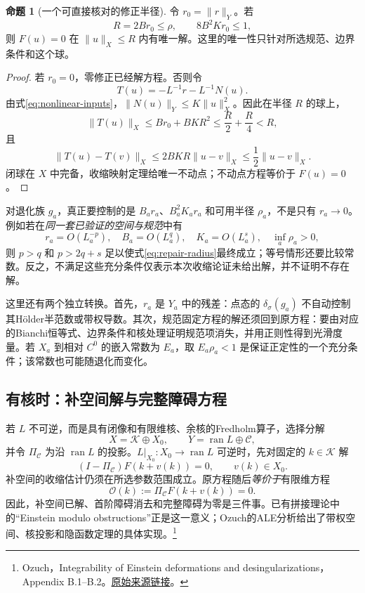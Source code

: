 \documentclass[11pt,a4paper]{article}
\theoremstyle{definition}
\newtheorem{proposition}[definition]{命题}
\newcommand{\src}[3]{\footnote{\raggedright #1，#2。\href{#3}{原始来源链接}。}}
\begin{document}
\begin{proposition}[一个可直接核对的修正半径]\label{prop:repair-radius}
令 $r_0=\|r\|_Y$。若
\begin{equation}\label{eq:repair-radius}
 R=2Br_0\le\rho,\qquad 8B^2Kr_0\le1,
\end{equation}
则 $F(u)=0$ 在 $\|u\|_X\le R$ 内有唯一解。这里的唯一性只针对所选规范、边界条件和这个球。
\end{proposition}
\begin{proof}
若 $r_0=0$，零修正已经解方程。否则令
\[
 T(u)=-L^{-1}r-L^{-1}N(u).
\]
由式\eqref{eq:nonlinear-inputs}，$\|N(u)\|_Y\le K\|u\|_X^2$。因此在半径 $R$ 的球上，
\[
 \|T(u)\|_X\le Br_0+BKR^2\le\frac R2+\frac R4< R,
\]
且
\[
 \|T(u)-T(v)\|_X\le2BKR\|u-v\|_X
 \le\frac12\|u-v\|_X.
\]
闭球在 $X$ 中完备，收缩映射定理给唯一不动点；不动点方程等价于 $F(u)=0$。
\end{proof}

对退化族 $g_a$，真正要控制的是 $B_ar_a$、$B_a^2K_ar_a$ 和可用半径 $\rho_a$，不是只有 $r_a\to0$。例如若在\emph{同一套已验证的空间与规范}中有
\[
 r_a=O(L_a^{-p}),\quad B_a=O(L_a^q),\quad
 K_a=O(L_a^s),\quad\inf_a\rho_a>0,
\]
则 $p>q$ 和 $p>2q+s$ 足以使式\eqref{eq:repair-radius}最终成立；等号情形还要比较常数。反之，不满足这些充分条件仅表示本次收缩论证未给出解，并不证明不存在解。

这里还有两个独立转换。首先，$r_a$ 是 $Y_a$ 中的残差：点态的 $\delta_\sigma(g_a)$ 不自动控制其Hölder半范数或带权导数。其次，规范固定方程的解还须回到原方程：要由对应的Bianchi恒等式、边界条件和核处理证明规范项消失，并用正则性得到光滑度量。若 $X_a$ 到相对 $C^0$ 的嵌入常数为 $E_a$，取 $E_a\rho_a<1$ 是保证正定性的一个充分条件；该常数也可能随退化而变化。

\subsection{有核时：补空间解与完整障碍方程}\label{sec:obstruction-bridge}

若 $L$ 不可逆，而是具有闭像和有限维核、余核的Fredholm算子，选择分解
\[
 X=\mathcal K\oplus X_0,\qquad
 Y=\operatorname{ran}L\oplus\mathcal C,
\]
并令 $\Pi_{\mathcal C}$ 为沿 $\operatorname{ran}L$ 的投影。$L|_{X_0}:X_0\to\operatorname{ran}L$ 可逆时，先对固定的 $k\in\mathcal K$ 解
\[
 (I-\Pi_{\mathcal C})F(k+v(k))=0,\qquad v(k)\in X_0.
\]
补空间的收缩估计仍须在所选参数范围成立。原方程随后\emph{等价于}有限维方程
\begin{equation}\label{eq:reduced-obstruction}
 \mathcal O(k):=\Pi_{\mathcal C}F(k+v(k))=0.
\end{equation}
因此，补空间已解、首阶障碍消去和完整障碍为零是三件事。已有拼接理论中的“Einstein modulo obstructions”正是这一意义；Ozuch的ALE分析给出了带权空间、核投影和隐函数定理的具体实现。\src{Ozuch}{Integrability of Einstein deformations and desingularizations，Appendix B.1--B.2}{https://arxiv.org/html/2105.13193v1}
\end{document}
